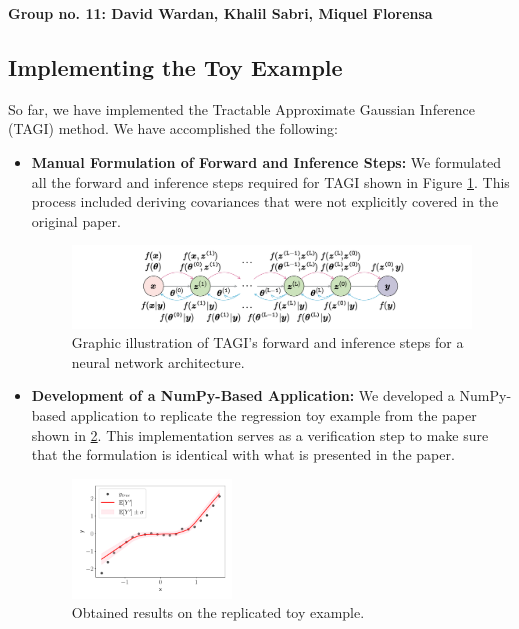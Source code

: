 \documentclass[12pt]{article}
\title{} %
\author{} %
\begin{document}
\!\!\!\!\!\!\!\!   \textbf{Group no. 11: David Wardan, Khalil Sabri, Miquel Florensa}
\subsection*{Implementing the Toy Example}
So far, we have implemented the Tractable Approximate Gaussian Inference (TAGI) method. We have accomplished the following:
\begin{itemize}[leftmargin=*]
    \item \textbf{Manual Formulation of Forward and Inference Steps:} We formulated all the forward and inference steps required for TAGI shown in Figure \ref{fig:tagi}. This process included deriving covariances that were not explicitly covered in the original paper.
\begin{figure}[h]
    \centering
    \includegraphics[width=\textwidth]{tagi.pdf}
    \caption{Graphic illustration of TAGI's forward and inference steps for a neural network architecture.}
    \label{fig:tagi}
\end{figure}
    \item \textbf{Development of a NumPy-Based Application:} We developed a NumPy-based application to replicate the regression toy example from the paper shown in \ref{fig:toy_example}. This implementation serves as a verification step to make sure that the formulation is identical with what is presented in the paper.
\begin{figure}[h]
    \centering
    \includegraphics[width=0.4\textwidth]{toy_example.pdf}
    \caption{Obtained results on the replicated toy example.}
    \label{fig:toy_example}
\end{figure}
\end{itemize}
\end{document}
